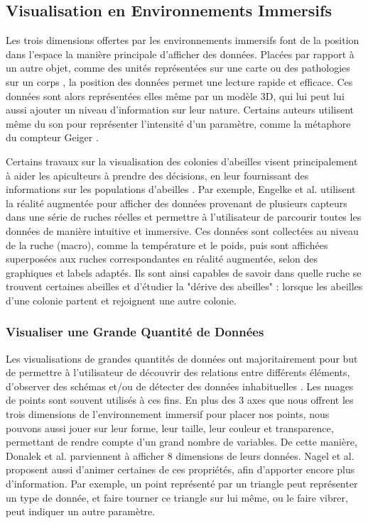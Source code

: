 	\subsection{Visualisation en Environnements Immersifs}
	
	Les trois dimensions offertes par les environnements immersifs font de la position dans l'espace la manière principale d'afficher des données. Placées par rapport à un autre objet, comme des unités représentées sur une carte \cite{durbin_battlefield_1998} ou des pathologies sur un corps \cite{coffey_interactive_2012}, la position des données permet une lecture rapide et efficace. Ces données sont alors représentées elles même par un modèle 3D, qui lui peut lui aussi ajouter un niveau d'information sur leur nature. Certains auteurs utilisent même du son pour représenter l'intensité d'un paramètre, comme la métaphore du compteur Geiger \cite{frohlich_exploring_1999}.
	
	
		
		Certains travaux sur la visualisation des colonies d'abeilles visent principalement à aider les apiculteurs à prendre des décisions, en leur fournissant des informations sur les populations d'abeilles \cite{engelke_visual_2016, engelke_melissar_2016, nguyen_augmented_2017}. Par exemple, Engelke et al. \cite{engelke_visual_2016} utilisent la réalité augmentée pour afficher des données provenant de plusieurs capteurs dans une série de ruches réelles et permettre à l'utilisateur de parcourir toutes les données de manière intuitive et immersive. Ces données sont collectées au niveau de la ruche (macro), comme la température et le poids, puis sont affichées superposées aux ruches correspondantes en réalité augmentée, selon des graphiques et labels adaptés. Ils sont ainsi capables de savoir dans quelle ruche se trouvent certaines abeilles et d'étudier la "dérive des abeilles" : lorsque les abeilles d'une colonie partent et rejoignent une autre colonie.
	
	\subsubsection{Visualiser une Grande Quantité de Données}
	
	 Les visualisations de grandes quantités de données ont majoritairement pour but de permettre à l'utilisateur de découvrir des relations entre différents éléments, d'observer des schémas et/ou de détecter des données inhabituelles \cite{nagel_methods_2001}.
	Les nuages de points sont souvent utilisés à ces fins. En plus des 3 axes que nous offrent les trois dimensions de l'environnement immersif pour placer nos points, nous pouvons aussi jouer sur leur forme, leur taille, leur couleur et transparence, permettant de rendre compte d'un grand nombre de variables. De cette manière, Donalek et al. \cite{donalek_immersive_2014} parviennent à afficher 8 dimensions de leurs données. Nagel et al. \cite{nagel_methods_2001} proposent aussi d'animer certaines de ces propriétés, afin d'apporter encore plus d'information. Par exemple, un point représenté par un triangle peut représenter un type de donnée, et faire tourner ce triangle sur lui même, ou le faire vibrer, peut indiquer un autre paramètre.
	
